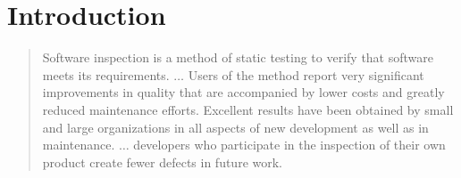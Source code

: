 \chapter{Introduction}

\begin{quote}
Software inspection is a method of static testing to verify that software meets
its requirements.
$\ldots$
Users of the method report very significant improvements in quality that are
accompanied by lower costs and greatly reduced maintenance efforts.
Excellent results have been obtained by small and large organizations in all
aspects of new development as well as in maintenance.
$\ldots$ developers who participate in the inspection of their own product
create fewer defects in future work.
\end{quote}

